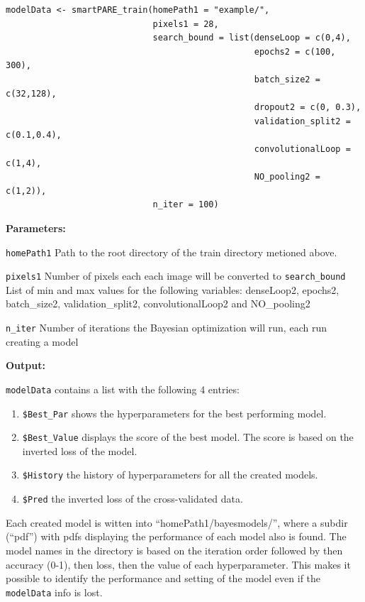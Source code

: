 \documentclass[
]{article}
\begin{document}
\begin{verbatim}
modelData <- smartPARE_train(homePath1 = "example/",
                             pixels1 = 28,
                             search_bound = list(denseLoop = c(0,4),  
                                                 epochs2 = c(100, 300),  
                                                 batch_size2 = c(32,128),  
                                                 dropout2 = c(0, 0.3),  
                                                 validation_split2 = c(0.1,0.4),  
                                                 convolutionalLoop = c(1,4),  
                                                 NO_pooling2 = c(1,2)),
                             n_iter = 100)
\end{verbatim}

\textbf{Parameters:}

\texttt{homePath1} Path to the root directory of the train directory
metioned above.

\texttt{pixels1} Number of pixels each each image will be converted to
\texttt{search\_bound} List of min and max values for the following
variables: denseLoop2, epochs2, batch\_size2, validation\_split2,
convolutionalLoop2 and NO\_pooling2

\texttt{n\_iter} Number of iterations the Bayesian optimization will
run, each run creating a model

\textbf{Output:}

\texttt{modelData} contains a list with the following 4 entries:

\begin{enumerate}
\def\labelenumi{\arabic{enumi}.}
\item
  \texttt{\$Best\_Par} shows the hyperparameters for the best performing
  model.
\item
  \texttt{\$Best\_Value} displays the score of the best model. The score
  is based on the inverted loss of the model.
\item
  \texttt{\$History} the history of hyperparameters for all the created
  models.
\item
  \texttt{\$Pred} the inverted loss of the cross-validated data.
\end{enumerate}

Each created model is witten into ``homePath1/bayesmodels/'', where a
subdir (``pdf'') with pdfs displaying the performance of each model also
is found. The model names in the directory is based on the iteration
order followed by then accuracy (0-1), then loss, then the value of each
hyperparameter. This makes it possible to identify the performance and
setting of the model even if the \texttt{modelData} info is lost.
\end{document}
